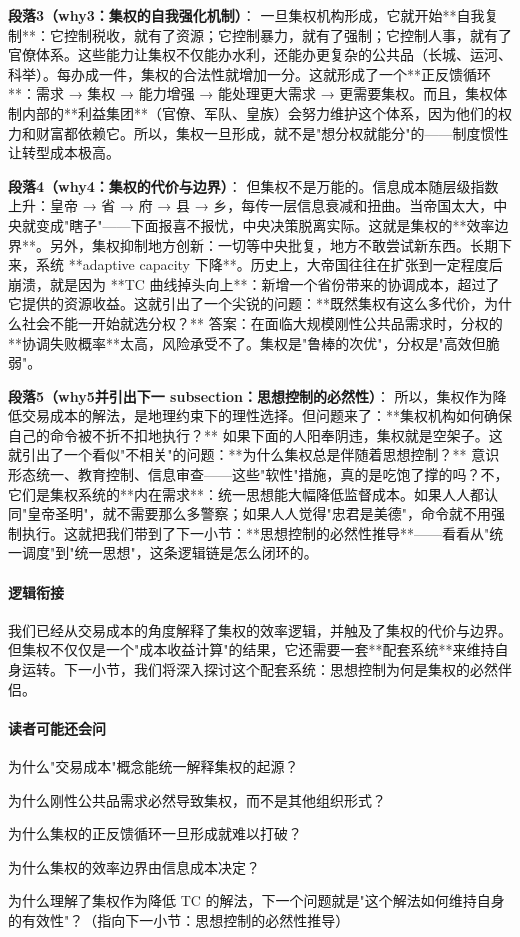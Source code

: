 \documentclass[openany, a4paper, 12pt]{book}
\begin{document}
	\textbf{段落3（why3：集权的自我强化机制）}：  
	一旦集权机构形成，它就开始**自我复制**：它控制税收，就有了资源；它控制暴力，就有了强制；它控制人事，就有了官僚体系。这些能力让集权不仅能办水利，还能办更复杂的公共品（长城、运河、科举）。每办成一件，集权的合法性就增加一分。这就形成了一个**正反馈循环**：需求 → 集权 → 能力增强 → 能处理更大需求 → 更需要集权。而且，集权体制内部的**利益集团**（官僚、军队、皇族）会努力维护这个体系，因为他们的权力和财富都依赖它。所以，集权一旦形成，就不是"想分权就能分"的——制度惯性让转型成本极高。
	
	\textbf{段落4（why4：集权的代价与边界）}：  
	但集权不是万能的。信息成本随层级指数上升：皇帝 → 省 → 府 → 县 → 乡，每传一层信息衰减和扭曲。当帝国太大，中央就变成"瞎子"——下面报喜不报忧，中央决策脱离实际。这就是集权的**效率边界**。另外，集权抑制地方创新：一切等中央批复，地方不敢尝试新东西。长期下来，系统 **adaptive capacity 下降**。历史上，大帝国往往在扩张到一定程度后崩溃，就是因为 **TC 曲线掉头向上**：新增一个省份带来的协调成本，超过了它提供的资源收益。这就引出了一个尖锐的问题：**既然集权有这么多代价，为什么社会不能一开始就选分权？** 答案：在面临大规模刚性公共品需求时，分权的**协调失败概率**太高，风险承受不了。集权是"鲁棒的次优"，分权是"高效但脆弱"。
	
	\textbf{段落5（why5并引出下一 subsection：思想控制的必然性）}：  
	所以，集权作为降低交易成本的解法，是地理约束下的理性选择。但问题来了：**集权机构如何确保自己的命令被不折不扣地执行？** 如果下面的人阳奉阴违，集权就是空架子。这就引出了一个看似"不相关"的问题：**为什么集权总是伴随着思想控制？** 意识形态统一、教育控制、信息审查——这些"软性"措施，真的是吃饱了撑的吗？不，它们是集权系统的**内在需求**：统一思想能大幅降低监督成本。如果人人都认同"皇帝圣明"，就不需要那么多警察；如果人人觉得"忠君是美德"，命令就不用强制执行。这就把我们带到了下一小节：**思想控制的必然性推导**——看看从"统一调度"到"统一思想"，这条逻辑链是怎么闭环的。
	
	\paragraph*{逻辑衔接}
	我们已经从交易成本的角度解释了集权的效率逻辑，并触及了集权的代价与边界。但集权不仅仅是一个"成本收益计算"的结果，它还需要一套**配套系统**来维持自身运转。下一小节，我们将深入探讨这个配套系统：思想控制为何是集权的必然伴侣。
	
	\paragraph*{读者可能还会问}
	\item 为什么"交易成本"概念能统一解释集权的起源？
	\item 为什么刚性公共品需求必然导致集权，而不是其他组织形式？
	\item 为什么集权的正反馈循环一旦形成就难以打破？
	\item 为什么集权的效率边界由信息成本决定？
	\item 为什么理解了集权作为降低 TC 的解法，下一个问题就是"这个解法如何维持自身的有效性"？（指向下一小节：思想控制的必然性推导）
	
\end{document}
